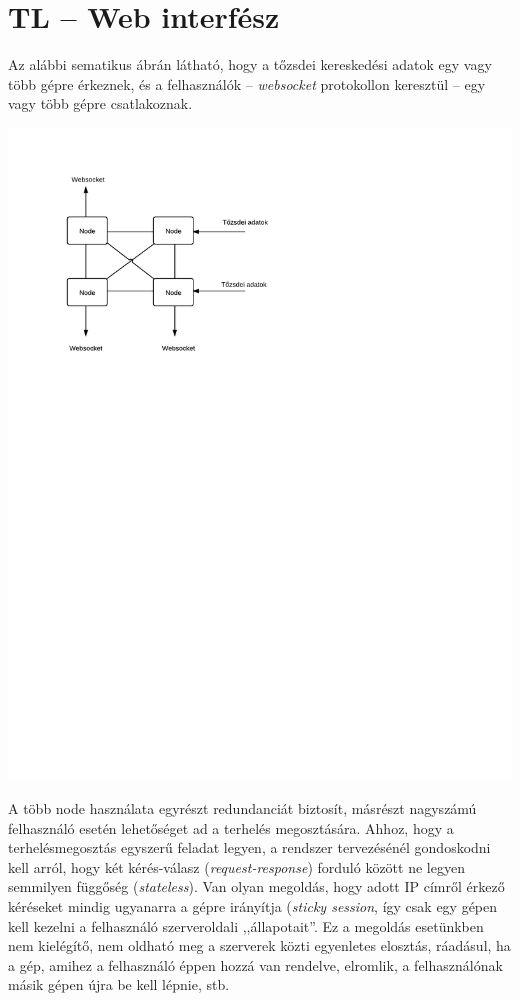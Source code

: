 \documentclass[12pt, a4paper, oneside]{book}
\begin{document}
\section{TL -- Web interfész}
Az alábbi sematikus ábrán látható, hogy a tőzsdei kereskedési adatok egy vagy
több gépre érkeznek, és a felhasználók -- \emph{websocket} protokollon
keresztül -- egy vagy több gépre csatlakoznak.

\includegraphics[clip=true, trim= 0 18cm 0 1cm]{fig/NodesWeb.pdf}

A több node használata egyrészt redundanciát biztosít, másrészt nagyszámú
felhasználó esetén lehetőséget ad a terhelés megosztására. Ahhoz, hogy a
terhelésmegosztás egyszerű feladat legyen, a rendszer tervezésénél gondoskodni
kell arról, hogy két kérés-válasz (\emph{request-response}) forduló között ne
legyen semmilyen függőség (\emph{stateless}). Van olyan megoldás, hogy adott IP
címről érkező kéréseket mindig ugyanarra a gépre irányítja (\emph{sticky
session}, így csak egy gépen kell kezelni a felhasználó szerveroldali
,,állapotait''. Ez a megoldás esetünkben nem kielégítő, nem oldható meg a
szerverek közti egyenletes elosztás, ráadásul, ha a gép, amihez a felhasználó
éppen hozzá van rendelve, elromlik, a felhasználónak másik gépen újra be kell
lépnie, stb.
\end{document}

